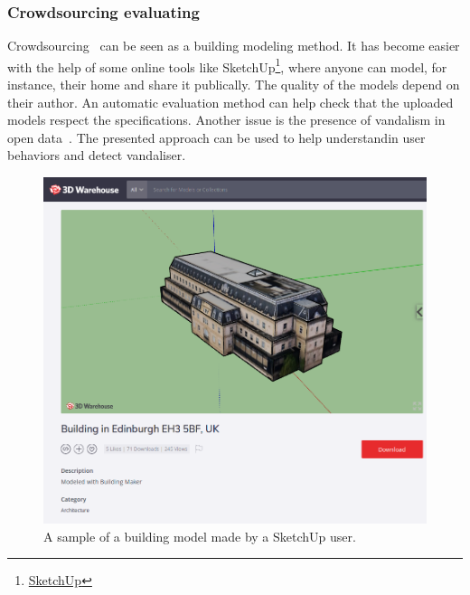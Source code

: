             \subsubsection{Crowdsourcing evaluating}
            Crowdsourcing~\parencite{kovashka2016crowdsourcing} can be seen as a building modeling method.
            It has become easier with the help of some online tools like SketchUp\footnote{
                \href{https://www.sketchup.com}{SketchUp}
            }, where anyone can model, for instance, their home and share it publically.
            The quality of the models depend on their author.
            An automatic evaluation method can help check that the uploaded models respect the specifications.
            Another issue is the presence of vandalism in open data~\parencite{neis2012towards}.
            The presented approach can be used to help understandin user behaviors and detect vandaliser.
            \begin{figure}[H]
                \centering
                \includegraphics[width=\textwidth]{images/introduction/use/crowdsourcing}
                \caption{\label{fig::crowdsourcing} A sample of a building model made by a SketchUp user.}
            \end{figure}

